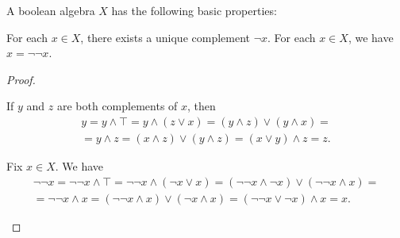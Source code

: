 \begin{proposition}\label{thm:boolean_algebra_properties}
  A boolean algebra \( X \) has the following basic properties:
  \begin{defenum}
     For each \( x \in X \), there exists a unique complement \( \neg x \).
     For each \( x \in X \), we have \( x = \neg \neg x \).
  \end{defenum}
\end{proposition}
\begin{proof}\mbox{}
  \begin{itemize}
     If \( y \) and \( z \) are both complements of \( x \), then
    \begin{align*}
      y
      =
      y \land \top
      =
      y \land (z \lor x)
      =
      (y \land z) \lor (y \land x)
      = \\ =
      y \land z
      =
      (x \land z) \lor (y \land z)
      =
      (x \lor y) \land z
      =
      z.
    \end{align*}

     Fix \( x \in X \). We have
    \begin{align*}
      \neg \neg x
      =
      \neg \neg x \land \top
      =
      \neg \neg x \land (\neg x \lor x)
      =
      (\neg \neg x \land \neg x) \lor (\neg \neg x \land x)
      = \\ =
      \neg \neg x \land x
      =
      (\neg \neg x \land x) \lor (\neg x \land x)
      =
      (\neg \neg x \lor \neg x) \land x
      =
      x.
    \end{align*}
  \end{itemize}
\end{proof}
